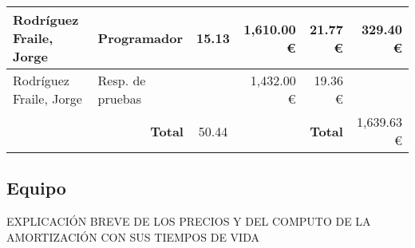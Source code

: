 \begin{table}[H]
{\begin{tabular}{ll|c|rr|r|}
			\multicolumn{1}{|l|}{Rodríguez Fraile, Jorge}                             & Programador                                                 & 15.13                                  & \multicolumn{1}{r|}{1,610.00 €}                              & 21.77 €                                                                             & 329.40 €                                                                             \\ \hline
			\multicolumn{1}{|l|}{Rodríguez Fraile, Jorge}                             & Resp. de pruebas                                            &                                        & \multicolumn{1}{r|}{1,432.00 €}                              & 19.36 €                                                                             &                                                                                      \\ \hline
			                                                                          & \multicolumn{1}{r|}{\textbf{Total}}                         & 50.44                                  & \multicolumn{1}{l}{}                                         & \textbf{Total}                                                                      & 1,639.63 €                                                                           \\ \cline{3-3} \cline{6-6}
		\end{tabular}%
	}
\end{table}

\subsection{Equipo}
EXPLICACIÓN BREVE DE LOS PRECIOS Y DEL COMPUTO DE LA AMORTIZACIÓN CON SUS TIEMPOS DE VIDA\cite{electronic_lifetime}

